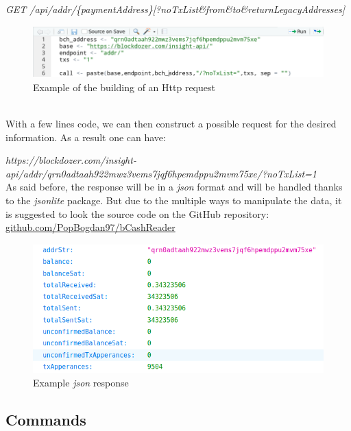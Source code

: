 \textit{GET /api/addr/\{paymentAddress\}[?noTxList\&from\&to\&returnLegacyAddresses]}
\\
\begin{figure}[h]
    \centering
    \includegraphics[height=2cm]{create_call.png}
    \caption{Example of the building of an Http request}
    \label{fig:request}
\end{figure}\\
With a few lines code, we can then construct a possible request for the desired information. 
As a result one can have:\medskip

\textit{https://blockdozer.com/insight-api/addr/qrn0adtaah922mwz3vems7jqf6hpemdppu2mvm75xe/?noTxList=1}
\medskip\\
As said before, the response will be in a \textit{json} format and will be handled thanks to the
\textit{jsonlite} package. But due to the multiple ways to manipulate the data, it is 
suggested to look the source code on the GitHub repository: \url{github.com/PopBogdan97/bCashReader}
\begin{figure}[h]

    \centering
    \includegraphics[height=5cm]{json_sample.png}
    \caption{Example \textit{json} response}
    \label{fig:response}
\end{figure}\pagebreak


\subsection{Commands}
\label{sec:commands}


